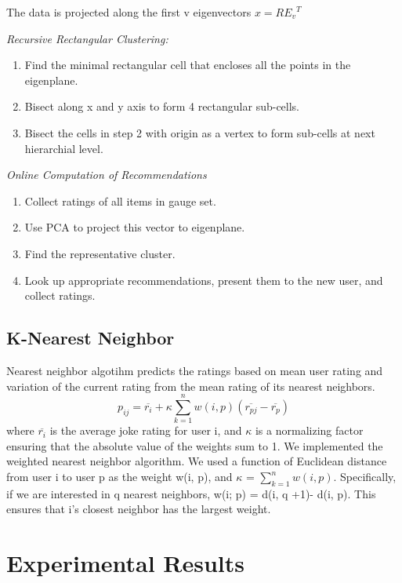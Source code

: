\documentclass{article} %
\begin{document}
The data is projected along the first v eigenvectors $x=R{E_{v}}^{T}$

\textit{Recursive Rectangular Clustering: }

\begin{enumerate}
\item Find the minimal rectangular cell that encloses all the points
  in the eigenplane.
\item Bisect along x and y axis to form 4 rectangular sub-cells.
\item Bisect the cells in step 2 with origin as a vertex to form
  sub-cells at next hierarchial level.
\end{enumerate}

 \textit{Online Computation of Recommendations}

\begin{enumerate}
\item Collect ratings of all items in gauge set.
\item Use PCA to project this vector to eigenplane.
\item Find the representative cluster.
\item Look up appropriate recommendations, present them to the new
  user, and collect ratings.
\end{enumerate}

\subsection{K-Nearest Neighbor}
Nearest neighbor algotihm predicts the ratings based on mean user rating and variation of the current rating from the mean rating of its nearest neighbors.
\begin{equation*}
p_{ij}=\overline{r_{i}}+\kappa\sum_{k=1}^n w(i,p)(\overline{r_{pj}}-\overline{r_{p}})
\end{equation*}
where $\overline{r_{i}}$ is the average joke rating for user i, and $\kappa$ is a
normalizing factor ensuring that the absolute value of the
weights sum to 1. We implemented the weighted nearest neighbor algorithm.
We used a function of Euclidean distance from
user i to user p as the weight w(i, p), and $\kappa$ = $\sum_{k=1}^n w(i,p)$.
Specifically, if we are interested in q nearest neighbors,
w(i; p) = d(i, q +1)- d(i, p). This ensures that i’s closest
neighbor has the largest weight.

\section{Experimental Results}
\end{document}
